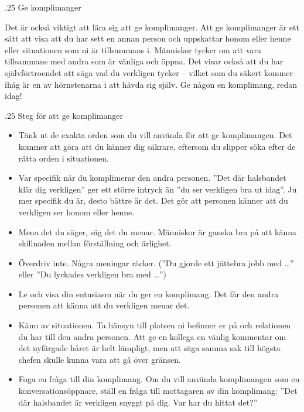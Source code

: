 \documentclass[swedish,a4paper]{book}
\makeatletter
\renewcommand\subsection{\@startsection{subsection}{1}{\z@}%
                                   {\baselineskip}%
                                   {.25\baselineskip}%
                                   {\fontsize{1\baselineskip}{1.25\baselineskip}\selectfont\sffamily\bfseries}} %
\renewcommand\subsubsection{\@startsection{subsubsection}{1}{\z@}%
                                   {\baselineskip}%
                                   {.25\baselineskip}%
                                   {\fontsize{1\baselineskip}{1.25\baselineskip}\selectfont\sffamily\color{accent}\bfseries}} %
\makeatother
\begin{document}
\subsection{Ge komplimanger}

Det är också viktigt att lära sig att ge komplimanger. Att ge komplimanger är ett sätt att visa att du har sett en annan person och uppskattar honom eller henne eller situationen som ni är tillsammans i. Människor tycker om att vara tillsammans med andra som är vänliga och öppna. Det visar också att du har självförtroendet att säga vad du verkligen tycker -- vilket som du säkert kommer ihåg är en av hörnstenarna i att hävda sig själv. Ge någon en komplimang, redan idag!

\subsubsection{Steg för att ge komplimanger}

\begin{itemize}

\item Tänk ut de exakta orden som du vill använda för att ge komplimangen. Det kommer att göra att du känner dig säkrare, eftersom du slipper söka efter de rätta orden i situationen.

\item Var specifik när du komplimerar den andra personen. ''Det där halsbandet klär dig verkligen'' ger ett större intryck än ''du ser verkligen bra ut idag''. Ju mer specifik du är, desto bättre är det. Det gör att personen känner att du verkligen ser honom eller henne.

\item Mena det du säger, säg det du menar. Människor är ganska bra på att känna skillnaden mellan förställning och ärlighet. 

\item Överdriv inte. Några meningar räcker. (''Du gjorde ett jättebra jobb med \ldots{}'' eller ''Du lyckades verkligen bra med \ldots{}'')
 
\item Le och visa din entusiasm när du ger en komplimang. Det får den andra personen att känna att du verkligen menar det.
 
\item Känn av situationen. Ta hänsyn till platsen ni befinner er på och relationen du har till den andra personen. Att ge en kollega en vänlig kommentar om det nyfärgade håret är helt lämpligt, men att säga samma sak till högsta chefen skulle kunna vara att gå över gränsen.

\item Foga en fråga till din komplimang. Om du vill använda komplimangen som en konversationsöppnare, ställ en fråga till mottagaren av din komplimang: ''Det där halsbandet är verkligen snyggt på dig. Var har du hittat det?''

\end{itemize}
\end{document}
